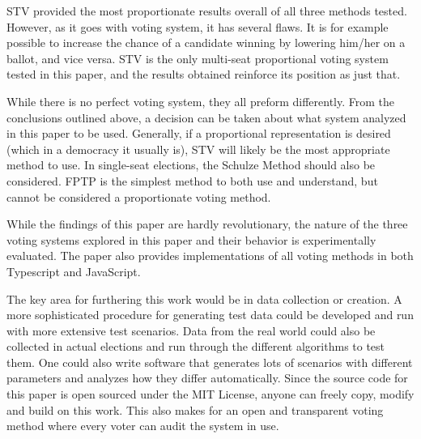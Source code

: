 \documentclass[12pt]{article}
\begin{document}
\begin{enumerate}
	STV provided the most proportionate results overall of all three methods tested. However, as it goes with voting system, it has several flaws. It is for example possible to increase the chance of a candidate winning by lowering him/her on a ballot, and vice versa. STV is the only multi-seat proportional voting system tested in this paper, and the results obtained reinforce its position as just that.
\end{enumerate}
While there is no perfect voting system, they all preform differently. From the conclusions outlined above, a decision can be taken about what system analyzed in this paper to be used. Generally, if a proportional representation is desired (which in a democracy it usually is), STV will likely be the most appropriate method to use. In single-seat elections, the Schulze Method should also be considered. FPTP is the simplest method to both use and understand, but cannot be considered a proportionate voting method.

While the findings of this paper are hardly revolutionary, the nature of the three voting systems explored in this paper and their behavior is experimentally evaluated. The paper also provides implementations of all voting methods in both Typescript and JavaScript.

The key area for furthering this work would be in data collection or creation. A more sophisticated procedure for generating test data could be developed and run with more extensive test scenarios. Data from the real world could also be collected in actual elections and run through the different algorithms to test them. One could also write software that generates lots of scenarios with different parameters and analyzes how they differ automatically. Since the source code for this paper is open sourced under the MIT License, anyone can freely copy, modify and build on this work. This also makes for an open and transparent voting method where every voter can audit the system in use.
\pagebreak
\end{document}
